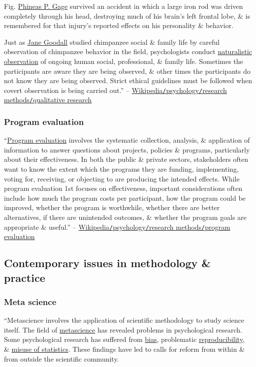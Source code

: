 \documentclass[oneside]{book}
\numberwithin{equation}{section}
\begin{document}
\textsf{Fig. \href{https://en.wikipedia.org/wiki/Phineas_P._Gage}{Phineas P. Gage} survived an accident in which a large iron rod was driven completely through his head, destroying much of his brain's left frontal lobe, \& is remembered for that injury's reported effects on his personality \& behavior.}

Just as \href{https://en.wikipedia.org/wiki/Jane_Goodall}{Jane Goodall} studied chimpanzee social \& family life by careful observation of chimpanzee behavior in the field, psychologists conduct \href{https://en.wikipedia.org/wiki/Naturalistic_observation}{naturalistic observation} of ongoing human social, professional, \& family life. Sometimes the participants are aware they are being observed, \& other times the participants do not know they are being observed. Strict ethical guidelines must be followed when covert observation is being carried out.'' -- \href{https://en.wikipedia.org/wiki/Psychology#Qualitative_research}{Wikipedia\texttt{/}psychology\texttt{/}research methods\texttt{/}qualitative research}

\subsubsection{Program evaluation}
``\href{https://en.wikipedia.org/wiki/Program_evaluation}{Program evaluation} involves the systematic collection, analysis, \& application of information to answer questions about projects, policies \& programs, particularly about their effectiveness. In both the public \& private sectors, stakeholders often want to know the extent which the programs they are funding, implementing, voting for, receiving, or objecting to are producing the intended effects. While program evaluation 1st focuses on effectiveness, important considerations often include how much the program costs per participant, how the program could be improved, whether the program is worthwhile, whether there are better alternatives, if there are unintended outcomes, \& whether the program goals are appropriate \& useful.'' -- \href{https://en.wikipedia.org/wiki/Psychology#Program_evaluation}{Wikipedia\texttt{/}psychology\texttt{/}research methods\texttt{/}program evaluation}

\subsection{Contemporary issues in methodology \& practice}

\subsubsection{Meta science}
``Metascience involves the application of scientific methodology to study science itself. The field of \href{https://en.wikipedia.org/wiki/Metascience}{metascience} has revealed problems in psychological research. Some psychological research has suffered from \href{https://en.wikipedia.org/wiki/Bias}{bias}, problematic \href{https://en.wikipedia.org/wiki/Reproducibility}{reproducibility}, \& \href{https://en.wikipedia.org/wiki/Misuse_of_statistics}{misuse of statistics}. These findings have led to calls for reform from within \& from outside the scientific community.
\end{document}
